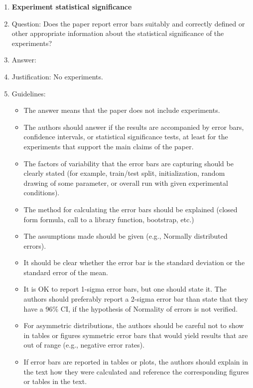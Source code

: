 \documentclass{article}
\numberwithin{theorem}{section}
\theoremstyle{definition}
\begin{document}
\begin{enumerate}
\item {\bf Experiment statistical significance}
    \item[] Question: Does the paper report error bars suitably and correctly defined or other appropriate information about the statistical significance of the experiments?
    \item[] Answer: \answerNA{} %
    \item[] Justification: No experiments.
    \item[] Guidelines:
    \begin{itemize}
        \item The answer \answerNA{} means that the paper does not include experiments.
        \item The authors should answer \answerYes{} if the results are accompanied by error bars, confidence intervals, or statistical significance tests, at least for the experiments that support the main claims of the paper.
        \item The factors of variability that the error bars are capturing should be clearly stated (for example, train/test split, initialization, random drawing of some parameter, or overall run with given experimental conditions).
        \item The method for calculating the error bars should be explained (closed form formula, call to a library function, bootstrap, etc.)
        \item The assumptions made should be given (e.g., Normally distributed errors).
        \item It should be clear whether the error bar is the standard deviation or the standard error of the mean.
        \item It is OK to report 1-sigma error bars, but one should state it. The authors should preferably report a 2-sigma error bar than state that they have a 96\% CI, if the hypothesis of Normality of errors is not verified.
        \item For asymmetric distributions, the authors should be careful not to show in tables or figures symmetric error bars that would yield results that are out of range (e.g., negative error rates).
        \item If error bars are reported in tables or plots, the authors should explain in the text how they were calculated and reference the corresponding figures or tables in the text.
    \end{itemize}


\end{enumerate}
\end{document}
